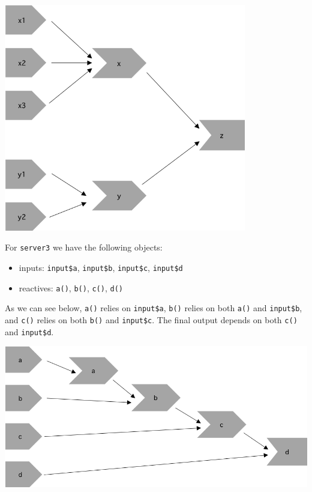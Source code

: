 \documentclass[]{book}
\providecommand{\tightlist}{%
  \setlength{\itemsep}{0pt}\setlength{\parskip}{0pt}}
\begin{document}
\begin{solution}
\includegraphics[width=4.16667in,height=\textheight]{images/4.3.6.1-s2.png}

For \texttt{server3} we have the following objects:

\begin{itemize}
\tightlist
\item
  inputs: \texttt{input\$a}, \texttt{input\$b}, \texttt{input\$c}, \texttt{input\$d}
\item
  reactives: \texttt{a()}, \texttt{b()}, \texttt{c()}, \texttt{d()}
\end{itemize}

As we can see below, \texttt{a()} relies on \texttt{input\$a}, \texttt{b()} relies on both \texttt{a()} and
\texttt{input\$b}, and \texttt{c()} relies on both \texttt{b()} and \texttt{input\$c}. The final output
depends on both \texttt{c()} and \texttt{input\$d}.

\includegraphics[width=6.25in,height=\textheight]{images/4.3.6.1-s3.png}

\end{solution}
\end{document}
